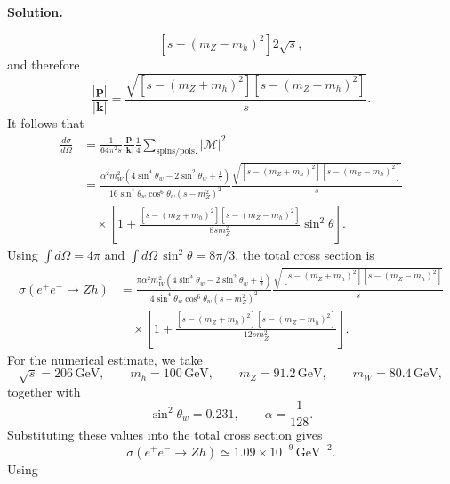 \documentclass[a4paper,11pt]{article}
\newenvironment{solution}{\par\medskip\noindent\textbf{Solution.}\par\smallskip}{\par\medskip}
\begin{document}
\begin{solution}
\begin{equation}
{{    \left[s-(m_Z-m_h)^2\right]}}{2\sqrt{s}},
\end{equation}
and therefore
\begin{equation}
    \frac{|\mathbf{p}|}{|\mathbf{k}|}
    =\frac{\sqrt{\left[s-(m_Z+m_h)^2\right]
    \left[s-(m_Z-m_h)^2\right]}}{s}.
\end{equation}
It follows that
\begin{equation}
\begin{aligned}
    \frac{d\sigma}{d\Omega}
    &=\frac{1}{64\pi^2s}\frac{|\mathbf{p}|}{|\mathbf{k}|}
    \frac{1}{4}\sum_{\mathrm{spins/pols.}}|\mathcal{M}|^2\\
    &=\frac{\alpha^2m_W^2
    \left(4\sin^4\theta_w-2\sin^2\theta_w+\frac{1}{2}\right)}
    {16\sin^4\theta_w\cos^6\theta_w(s-m_Z^2)^2}
    \frac{\sqrt{\left[s-(m_Z+m_h)^2\right]
    \left[s-(m_Z-m_h)^2\right]}}{s}\\
    &\quad\times\left[1+
    \frac{\left[s-(m_Z+m_h)^2\right]\left[s-(m_Z-m_h)^2\right]}
    {8sm_Z^2}\sin^2\theta\right].
\end{aligned}
\end{equation}
Using $\int d\Omega=4\pi$ and
$\int d\Omega\,\sin^2\theta=8\pi/3$, the total cross section is
\begin{equation}
\begin{aligned}
    \sigma(e^+e^-\to Zh)
    &=\frac{\pi\alpha^2m_W^2
    \left(4\sin^4\theta_w-2\sin^2\theta_w+\frac{1}{2}\right)}
    {4\sin^4\theta_w\cos^6\theta_w(s-m_Z^2)^2}
    \frac{\sqrt{\left[s-(m_Z+m_h)^2\right]
    \left[s-(m_Z-m_h)^2\right]}}{s}\\
    &\quad\times\left[1+
    \frac{\left[s-(m_Z+m_h)^2\right]\left[s-(m_Z-m_h)^2\right]}
    {12sm_Z^2}\right].
\end{aligned}
\end{equation}
For the numerical estimate, we take
\begin{equation}
    \sqrt{s}=206\,\mathrm{GeV},\qquad
    m_h=100\,\mathrm{GeV},\qquad
    m_Z=91.2\,\mathrm{GeV},\qquad
    m_W=80.4\,\mathrm{GeV},
\end{equation}
together with
\begin{equation}
    \sin^2\theta_w=0.231,
    \qquad
    \alpha=\frac{1}{128}.
\end{equation}
Substituting these values into the total cross section gives
\begin{equation}
    \sigma(e^+e^-\to Zh)
    \simeq 1.09\times10^{-9}\,\mathrm{GeV}^{-2}.
\end{equation}
Using
\begin{equation}

\end{equation}
\end{solution}
\end{document}
